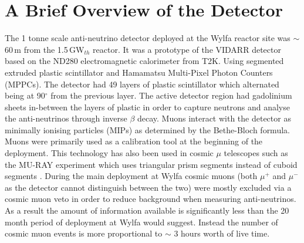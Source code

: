 \documentclass[12pt,a4paper]{article}
\begin{document}
\section{A Brief Overview of the Detector}
The 1 tonne scale anti-neutrino detector deployed at the Wylfa reactor site was $\sim$ 60\,m from the 1.5\,GW$_{th}$ reactor. It was a prototype of the VIDARR detector based on the ND280 electromagnetic calorimeter from T2K. Using segmented extruded plastic scintillator and Hamamatsu Multi-Pixel Photon Counters (MPPCs). The detector had 49 layers of plastic scintillator which alternated being at 90$^\circ$ from the previous layer. The active detector region had gadolinium sheets in-between the layers of plastic in order to capture neutrons and analyse the anti-neutrinos through inverse $\beta$ decay. Muons interact with the detector as minimally ionising particles (MIPs) as determined by the Bethe-Bloch formula. Muons were primarily used as a calibration tool at the beginning of the deployment\cite{Carroll_2018}. This technology has also been used in cosmic $\mu$ telescopes such as the MU-RAY experiment which uses triangular prism segments instead of cuboid segments \cite{ANASTASIO2013423}. During the main deployment at Wylfa cosmic muons (both $\mu^+$ and $\mu^-$ as the detector cannot distinguish between the two) were mostly excluded via a cosmic muon veto in order to reduce background when measuring anti-neutrinos. As a result the amount of information available is significantly less than the 20 month period of deployment at Wylfa would suggest. Instead the number of cosmic muon events is more proportional to $\sim$ 3 hours worth of live time. 
 
\end{document}
